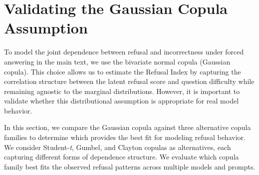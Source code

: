 \documentclass{article} %
\theoremstyle{definition}
\begin{document}
\section{Validating the Gaussian Copula Assumption}
\label{app:copula_validation}

To model the joint dependence between refusal and incorrectness under forced answering in the main text, we use the bivariate normal copula (Gaussian copula). This choice allows us to estimate the Refusal Index by capturing the correlation structure between the latent refusal score and question difficulty while remaining agnostic to the marginal distributions. However, it is important to validate whether this distributional assumption is appropriate for real model behavior.

In this section, we compare the Gaussian copula against three alternative copula families to determine which provides the best fit for modeling refusal behavior. We consider Student-\emph{t}, Gumbel, and Clayton copulas as alternatives, each capturing different forms of dependence structure. We evaluate which copula family best fits the observed refusal patterns across multiple models and prompts.
\end{document}
